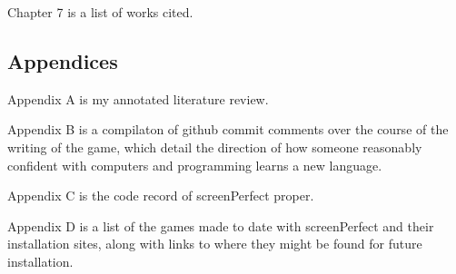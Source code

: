 Chapter 7 is a list of works cited.

\subsection{Appendices}
Appendix A is my annotated literature review.

Appendix B is a compilaton of github commit comments over the course of the writing of the game, which detail the direction of how someone reasonably confident with computers and programming learns a new language. 

Appendix C is the code record of screenPerfect proper.

Appendix D is a list of the games made to date with screenPerfect and their installation sites, along with links to where they might be found for future installation.
